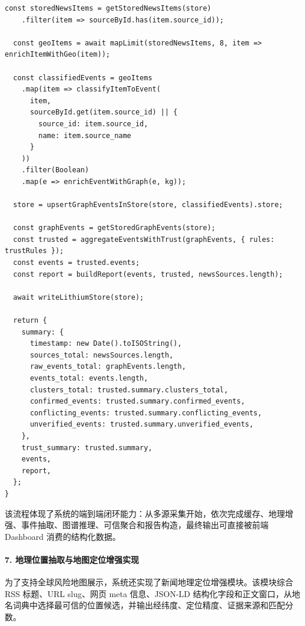 \documentclass[12pt,a4paper]{article}
\begin{document}
\begin{lstlisting}[style=projectcode,caption={多源采集、增量入库、图谱增强与可信聚合流程}]
  const storedNewsItems = getStoredNewsItems(store)
    .filter(item => sourceById.has(item.source_id));

  const geoItems = await mapLimit(storedNewsItems, 8, item => enrichItemWithGeo(item));

  const classifiedEvents = geoItems
    .map(item => classifyItemToEvent(
      item,
      sourceById.get(item.source_id) || {
        source_id: item.source_id,
        name: item.source_name
      }
    ))
    .filter(Boolean)
    .map(e => enrichEventWithGraph(e, kg));

  store = upsertGraphEventsInStore(store, classifiedEvents).store;

  const graphEvents = getStoredGraphEvents(store);
  const trusted = aggregateEventsWithTrust(graphEvents, { rules: trustRules });
  const events = trusted.events;
  const report = buildReport(events, trusted, newsSources.length);

  await writeLithiumStore(store);

  return {
    summary: {
      timestamp: new Date().toISOString(),
      sources_total: newsSources.length,
      raw_events_total: graphEvents.length,
      events_total: events.length,
      clusters_total: trusted.summary.clusters_total,
      confirmed_events: trusted.summary.confirmed_events,
      conflicting_events: trusted.summary.conflicting_events,
      unverified_events: trusted.summary.unverified_events,
    },
    trust_summary: trusted.summary,
    events,
    report,
  };
}
\end{lstlisting}

该流程体现了系统的端到端闭环能力：从多源采集开始，依次完成缓存、地理增强、事件抽取、图谱推理、可信聚合和报告构造，最终输出可直接被前端 Dashboard 消费的结构化数据。

\paragraph{7. 地理位置抽取与地图定位增强实现}

为了支持全球风险地图展示，系统还实现了新闻地理定位增强模块。该模块综合 RSS 标题、URL slug、网页 meta 信息、JSON-LD 结构化字段和正文窗口，从地名词典中选择最可信的位置候选，并输出经纬度、定位精度、证据来源和匹配分数。
\end{document}
